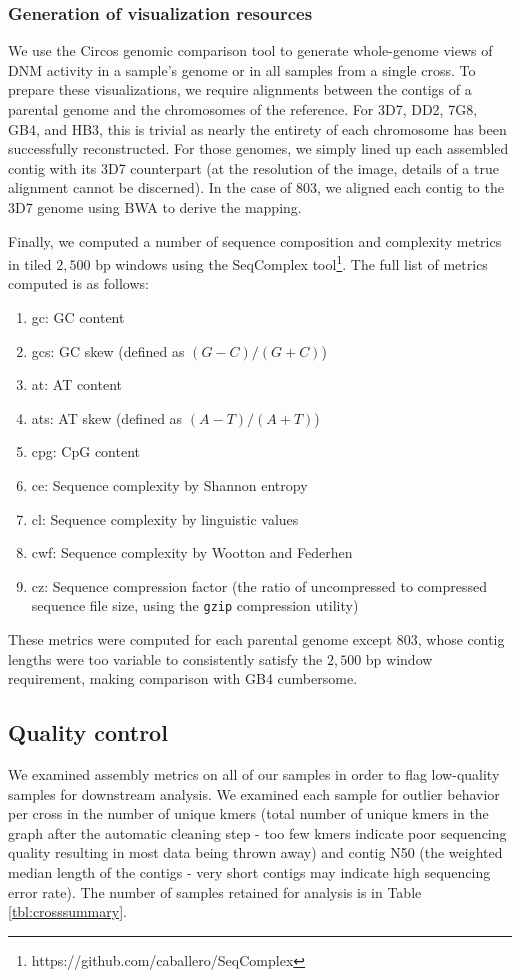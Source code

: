 \subsubsection{Generation of visualization resources}

We use the Circos\cite{Krzywinski:2009ix} genomic comparison tool to generate whole-genome views of DNM activity in a sample's genome or in all samples from a single cross.  To prepare these visualizations, we require alignments between the contigs of a parental genome and the chromosomes of the reference.  For 3D7, DD2, 7G8, GB4, and HB3, this is trivial as nearly the entirety of each chromosome has been successfully reconstructed.  For those genomes, we simply lined up each assembled contig with its 3D7 counterpart (at the resolution of the image, details of a true alignment cannot be discerned).  In the case of 803, we aligned each contig to the 3D7 genome using BWA to derive the mapping.  

Finally, we computed a number of sequence composition and complexity metrics in tiled $2,500$ bp windows using the SeqComplex tool\footnote{https://github.com/caballero/SeqComplex}.  The full list of metrics computed is as follows:

\begin{enumerate}
\item gc: GC content
\item gcs: GC skew (defined as $(G - C)/(G + C)$)
\item at: AT content
\item ats: AT skew (defined as $(A - T)/(A + T)$)
\item cpg: CpG content
\item ce: Sequence complexity by Shannon entropy\cite{Shannon:1948iy}
\item cl: Sequence complexity by linguistic values\cite{Trifonov:1990vu}
\item cwf: Sequence complexity by Wootton and Federhen\cite{Wootton:1996tu}
\item cz: Sequence compression factor (the ratio of uncompressed to compressed sequence file size, using the \texttt{gzip} compression utility)
\end{enumerate}

These metrics were computed for each parental genome except 803, whose contig lengths were too variable to consistently satisfy the $2,500$ bp window requirement, making comparison with GB4 cumbersome.

\subsection{Quality control}
We examined assembly metrics on all of our samples in order to flag low-quality samples for downstream analysis.  We examined each sample for outlier behavior per cross in the number of unique kmers (total number of unique kmers in the graph after the automatic cleaning step - too few kmers indicate poor sequencing quality resulting in most data being thrown away) and contig N50 (the weighted median length of the contigs - very short contigs may indicate high sequencing error rate).  The number of samples retained for analysis is in Table \ref{tbl:crosssummary}.


